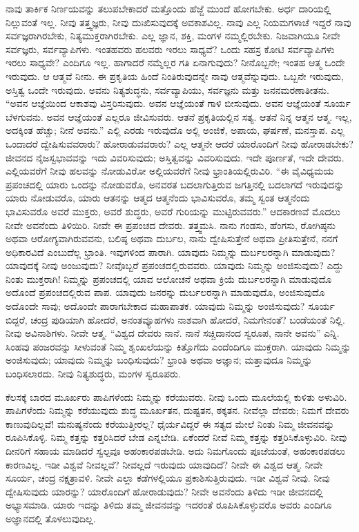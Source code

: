 ನಾವು ತಾರ್ಕಿಕ ನಿರ್ಣಯವನ್ನು ತಲುಪಬೇಕಾದರೆ ಮತ್ತೊಂದು ಹೆಜ್ಜೆ ಮುಂದೆ ಹೋಗಬೇಕು. ಅರ್ಧ ದಾರಿಯಲ್ಲಿ ನಿಲ್ಲುವಂತೆ ಇಲ್ಲ. ನೀವು ತತ್ತ್ವಜ್ಞರು, ನೀವು ದುಃಖಿಸುವುದಕ್ಕೆ ಅವಕಾಶವಿಲ್ಲ. ನಾವು ಎಲ್ಲ ನಿಯಮಗಳಾಚೆ ಇದ್ದರೆ ನಾವು ಸರ್ವಜ್ಞರಾಗಿರಬೇಕು, ನಿತ್ಯಮುಕ್ತರಾಗಿರಬೇಕು. ಎಲ್ಲ ಜ್ಞಾನ, ಶಕ್ತಿ, ಮಂಗಳ ನಮ್ಮಲ್ಲಿರಬೇಕು. ನಿಜವಾಗಿಯೂ ನೀವೇ ಸರ್ವಜ್ಞರು, ಸರ್ವವ್ಯಾಪಿಗಳು. ಇಂತಹವರು ಹಲವರು ಇರಲು ಸಾಧ್ಯವೆ? ಒಂದು ಸಹಸ್ರ ಕೋಟಿ ಸರ್ವವ್ಯಾಪಿಗಳು ಇರಲು ಸಾಧ್ಯವೇ? ಎಂದಿಗೂ ಇಲ್ಲ. ಹಾಗಾದರೆ ನಮ್ಮೆಲ್ಲರ ಗತಿ ಏನಾಗುವುದು? ನೀನೊಬ್ಬನೇ; ಇಂತಹ ಆತ್ಮ ಒಂದೇ ಇರುವುದು. ಆ ಆತ್ಮವೆ ನೀನು. ಈ ಪ್ರಕೃತಿಯ ಹಿಂದೆ ನಿಂತಿರುವುದನ್ನೇ ನಾವು ಆತ್ಮವೆನ್ನುವುದು. ಒಬ್ಬನೇ ಇರುವುದು, ಅಸ್ತಿತ್ವ ಒಂದೇ ಇರುವುದು. ಅವನು ನಿತ್ಯಶುದ್ಧನು, ಸರ್ವವ್ಯಾಪಿಯು, ಸರ್ವಜ್ಞನು ಮತ್ತು ಜನನಮರಣಾತೀತನು. “ಅವನ ಆಜ್ಞೆಯಿಂದ ಆಕಾಶವು ವಿಸ್ತರಿಸುವುದು. ಅವನ ಆಜ್ಞೆಯಂತೆ ಗಾಳಿ ಬೀಸುವುದು. ಅವನ ಆಜ್ಞೆಯಂತೆ ಸೂರ್ಯ ಬೆಳಗುವನು. ಅವನ ಆಜ್ಞೆಯಂತೆ ಎಲ್ಲರೂ ಜೀವಿಸುವರು. ಆತನೆ ಪ್ರಕೃತಿಯಲ್ಲಿನ ಸತ್ಯ. ಆತನೆ ನಿನ್ನ ಆತ್ಮನ ಆತ್ಮ. ಇಲ್ಲ, ಅದಕ್ಕಿಂತ ಹೆಚ್ಚು; ನೀನೆ ಅವನು.” ಎಲ್ಲಿ ಎರಡು ಇರುವುದೊ ಅಲ್ಲಿ ಅಂಜಿಕೆ, ಅಪಾಯ, ಘರ್ಷಣೆ, ಮನಸ್ತಾಪ. ಎಲ್ಲ ಒಂದಾದರೆ ದ್ವೇಷಿಸುವವರಾರು? ಹೋರಾಡುವವರಾರು? ಎಲ್ಲ ಆತ್ಮನೇ ಆದರೆ ಯಾರೊಂದಿಗೆ ನೀವು ಹೋರಾಡಬೇಕು? ಜೀವನದ ನೈಜಸ್ವಭಾವವನ್ನು ಇದು ವಿವರಿಸುವುದು; ಅಸ್ತಿತ್ವವನ್ನು ವಿವರಿಸುವುದು. ಇದೇ ಪೂರ್ಣತೆ, ಇದೇ ದೇವರು. ಎಲ್ಲಿಯವರೆಗೆ ನೀವು ಹಲವನ್ನು ನೋಡುವಿರೋ ಅಲ್ಲಿಯವರೆಗೆ ನೀವು ಭ್ರಾಂತಿಯಲ್ಲಿರುವಿರಿ. “ಈ ವೈವಿಧ್ಯಮಯ ಪ್ರಪಂಚದಲ್ಲಿ ಯಾರು ಒಂದನ್ನು ನೋಡುವರೊ, ಅನವರತ ಬದಲಾಗುತ್ತಿರುವ ಜಗತ್ತಿನಲ್ಲಿ ಬದಲಾಗದೆ ಇರುವುದನ್ನು ಯಾರು ನೋಡುವರೊ, ಯಾರು ಆತನನ್ನು ಆತ್ಮದ ಆತ್ಮನೆಂದು ಭಾವಿಸುವರೊ, ತಮ್ಮ ಸ್ವಂತ ಆತ್ಮನೆಂದು ಭಾವಿಸುವರೊ ಅವರೆ ಮುಕ್ತರು, ಅವರೆ ಶುದ್ಧರು, ಅವರೆ ಗುರಿಯನ್ನು ಮುಟ್ಟಿರುವವರು.” ಆದಕಾರಣವೆ ಮೊದಲು ನೀವೇ ಅವನೆಂದು ತಿಳಿಯಿರಿ. ನೀವೇ ಈ ಪ್ರಪಂಚದ ದೇವರು. ತತ್ತ್ವಮಸಿ. ನಾನು ಗಂಡಸು, ಹೆಂಗಸು, ರೋಗಿಷ್ಠನು ಅಥವಾ ಆರೋಗ್ಯವಾಗಿರುವವನು, ಬಲಿಷ್ಠ ಅಥವಾ ದುರ್ಬಲ, ನಾನು ದ್ವೇಷಿಸುತ್ತೇನೆ ಅಥವಾ ಪ್ರೀತಿಸುತ್ತೇನೆ, ನನಗೆ ಅಧಿಕಾರವಿದೆ ಎಂಬುದೆಲ್ಲ ಭ್ರಾಂತಿ. ಇವುಗಳಿಂದ ಪಾರಾಗಿ. ಯಾವುದು ನಿಮ್ಮನ್ನು ದುರ್ಬಲರನ್ನಾಗಿ ಮಾಡುವುದು? ಯಾವುದಕ್ಕೆ ನೀವು ಅಂಜುವುದು? ನೀವೊಬ್ಬರೆ ಪ್ರಪಂಚದಲ್ಲಿರುವವರು. ಯಾವುದು ನಿಮ್ಮನ್ನು ಅಂಜಿಸುವುದು? ಎದ್ದು ನಿಂತು ಮುಕ್ತರಾಗಿ! ನಿಮ್ಮನ್ನು ಪ್ರಪಂಚದಲ್ಲಿ ಯಾವ ಆಲೋಚನೆ ಅಥವಾ ಕ್ರಿಯೆ ದುರ್ಬಲರನ್ನಾಗಿ ಮಾಡುವುದೊ ಅದೊಂದೆ ಪ್ರಪಂಚದಲ್ಲಿರುವ ಪಾಪ. ಯಾವುದು ಜನರನ್ನು ದುರ್ಬಲರನ್ನಾಗಿ ಮಾಡುವುದೊ, ಅಂಜಿಸುವುದೊ ಅದೊಂದೇ ಸಾವು; ಅದೊಂದೇ ಪಾರಾಗಬೇಕಾದ ಮಹಾಪಾತಕ. ಯಾವುದು ನಿಮ್ಮನ್ನು ಅಂಜಿಸುವುದು? ಸೂರ್ಯ ಬಿದ್ದರೆ, ಚಂದ್ರ ಪುಡಿಯಾಗಿ ಹೋದರೆ, ಅನಂತವ್ಯೂಹಗಳು ನಾಶವಾಗಿ ಹೋದರೆ, ನಿಮಗೇನಂತೆ? ಬಂಡೆಯಂತೆ ನಿಲ್ಲಿ. ನೀವು ಅವಿನಾಶಿಗಳು. ನೀವೇ ಆತ್ಮ. “ವಿಶ್ವದ ದೇವರು ನಾನೆ. ನಾನೆ ಸಚ್ಚಿದಾನಂದ ಸ್ವರೂಪ, ನಾನೇ ಅವನು” ಎನ್ನಿ. ಸಿಂಹವು ಪಂಜರವನ್ನು ಸೀಳುವಂತೆ ನಿಮ್ಮ ಶೃಂಖಲೆಯನ್ನು ಕಿತ್ತೊಗೆದು ಎಂದೆಂದಿಗೂ ಮುಕ್ತರಾಗಿ. ಯಾವುದು ನಿಮ್ಮನ್ನು ಅಂಜಿಸುವುದು; ಯಾವುದು ನಿಮ್ಮನ್ನು ಬಂಧಿಸುವುದು? ಭ್ರಾಂತಿ ಅಥವಾ ಅಜ್ಞಾನ; ಮತ್ತಾವುದೂ ನಿಮ್ಮನ್ನು ಬಂಧಿಸಲಾರದು. ನೀವು ನಿತ್ಯಶುದ್ಧರು, ಮಂಗಳ ಸ್ವರೂಪರು.

ಕೆಲಸಕ್ಕೆ ಬಾರದ ಮೂರ್ಖರು ಪಾಪಿಗಳೆಂದು ನಿಮ್ಮನ್ನು ಕರೆಯುವರು. ನೀವು ಒಂದು ಮೂಲೆಯಲ್ಲಿ ಕುಳಿತು ಅಳುವಿರಿ. ಪಾಪಿಗಳೆಂದು ನಿಮ್ಮನ್ನು ಕರೆಯುವುದು ಶುದ್ಧ ಮೂರ್ಖತನ, ದುಷ್ಟತನ, ಠಕ್ಕತನ. ನೀವೆಲ್ಲಾ ದೇವರು; ನಿಮಗೆ ದೇವರು ಕಾಣುವುದಿಲ್ಲವೆ! ಮನುಷ್ಯನೆಂದು ಕರೆಯುತ್ತೀರಲ್ಲ? ಧೈರ್ಯವಿದ್ದರೆ ಈ ಸತ್ಯದ ಮೇಲೆ ನಿಂತು ನಿಮ್ಮ ಜೀವನವನ್ನು ರೂಪಿಸಿಕೊಳ್ಳಿ. ನಿಮ್ಮ ಕತ್ತನ್ನು ಕತ್ತರಿಸಿದರೆ ಬೇಡ ಎನ್ನಬೇಡಿ. ಏಕೆಂದರೆ ನೀವೆ ನಿಮ್ಮ ಕತ್ತನ್ನು ಕತ್ತರಿಸಿಕೊಳ್ಳುವಿರಿ. ನೀವು ದೀನರಿಗೆ ಸಹಾಯ ಮಾಡಿದರೆ ಸ್ವಲ್ಪವೂ ಅಹಂಕಾರಪಡಬೇಡಿ. ಅದು ನಿಮಗೊಂದು ಪೂಜೆಯಂತೆ, ಅಹಂಕಾರಪಡಲು ಕಾರಣವಿಲ್ಲ. ಇಡೀ ವಿಶ್ವವೆ ನೀವಲ್ಲವೆ? ನೀವಲ್ಲದೆ ಇರುವುದು ಯಾವುದಿದೆ? ನೀವೇ ಈ ವಿಶ್ವದ ಆತ್ಮ. ನೀವೇ ಸೂರ್ಯ, ಚಂದ್ರ ನಕ್ಷತ್ರಾವಳಿ. ನೀವೇ ಎಲ್ಲಾ ಕಡೆಗಳಲ್ಲಿಯೂ ಪ್ರಕಾಶಿಸುತ್ತಿರುವುದು. ಇಡೀ ವಿಶ್ವವೆ ನೀವು. ನೀವು ದ್ವೇಷಿಸುವುದು ಯಾರನ್ನು? ಯಾರೊಂದಿಗೆ ಹೋರಾಡುವುದು? ನೀವೇ ಅವನೆಂದು ತಿಳಿದು ಇಡೀ ಜೀವನದಲ್ಲಿ ಅಭ್ಯಾಸಮಾಡಿ. ಯಾರು ಇದನ್ನು ತಿಳಿದು ತಮ್ಮ ಜೀವನವನ್ನು ಇದರಂತೆ ರೂಪಿಸಿಕೊಳ್ಳುವರೊ ಅವರು ಎಂದಿಗೂ ಅಜ್ಞಾನದಲ್ಲಿ ತೊಳಲುವುದಿಲ್ಲ.

